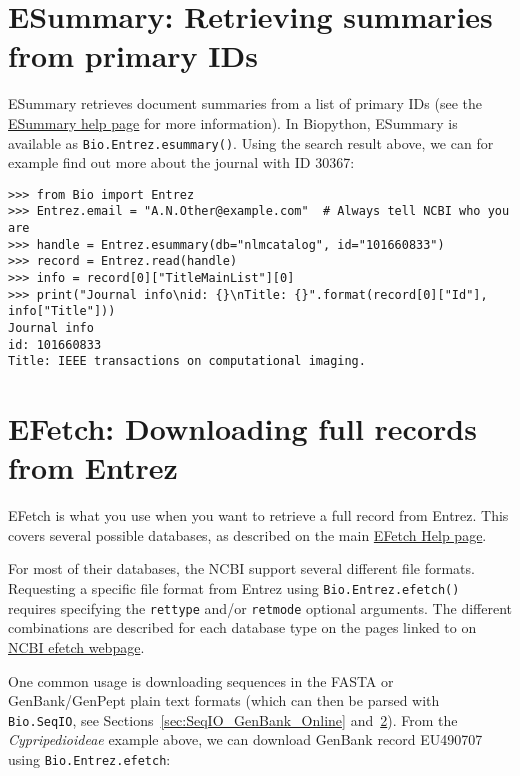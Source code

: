\section{ESummary: Retrieving summaries from primary IDs}
ESummary retrieves document summaries from a list of primary IDs (see the  \href{https://www.ncbi.nlm.nih.gov/books/NBK25499/#chapter4.ESummary}{ESummary help page} for more information). In Biopython, ESummary is available as \verb+Bio.Entrez.esummary()+. Using the search result above, we can for example find out more about the journal with ID 30367:

\begin{verbatim}
>>> from Bio import Entrez
>>> Entrez.email = "A.N.Other@example.com"  # Always tell NCBI who you are
>>> handle = Entrez.esummary(db="nlmcatalog", id="101660833")
>>> record = Entrez.read(handle)
>>> info = record[0]["TitleMainList"][0]
>>> print("Journal info\nid: {}\nTitle: {}".format(record[0]["Id"], info["Title"]))
Journal info
id: 101660833
Title: IEEE transactions on computational imaging.
\end{verbatim}

\section{EFetch: Downloading full records from Entrez}
\label{sec:efetch}

EFetch is what you use when you want to retrieve a full record from Entrez.
This covers several possible databases, as described on the main \href{https://www.ncbi.nlm.nih.gov/books/NBK3837/}{EFetch Help page}.

For most of their databases, the NCBI support several different file formats. Requesting a specific file format from Entrez using \verb|Bio.Entrez.efetch()| requires specifying the \verb|rettype| and/or \verb|retmode| optional arguments.  The different combinations are described for each database type on the pages linked to on \href{https://www.ncbi.nlm.nih.gov/books/NBK25499/#chapter4.EFetch}{NCBI efetch webpage}.

One common usage is downloading sequences in the FASTA or GenBank/GenPept plain text formats (which can then be parsed with \verb|Bio.SeqIO|, see Sections~\ref{sec:SeqIO_GenBank_Online} and~\ref{sec:efetch}). From the \emph{Cypripedioideae} example above, we can download GenBank record EU490707 using \verb+Bio.Entrez.efetch+:

